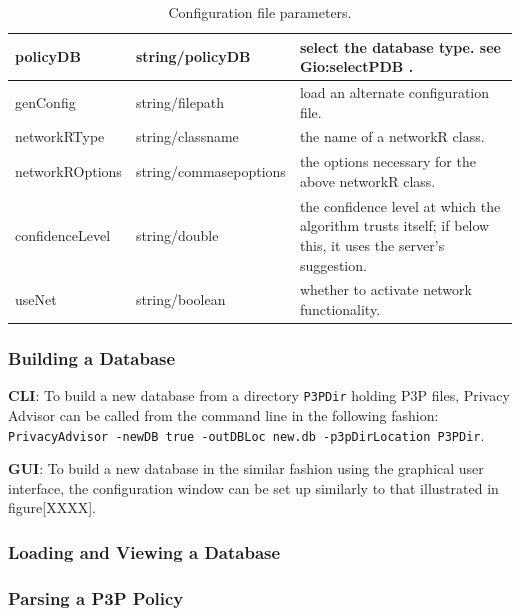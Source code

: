 \begin{center}
\begin{table}[h!]
\begin{tabular} { | l | l | p{7cm} | }
      policyDB & string/policyDB & select the database type. see Gio:selectPDB . \\ \hline
      genConfig	& string/filepath & load an alternate configuration file. \\ \hline
      networkRType & string/classname & the name of a networkR class. \\ \hline
      networkROptions & string/commasepoptions	& the options necessary for the above networkR class. \\ \hline
      confidenceLevel & string/double & the confidence level at which the algorithm trusts itself; if below this, it uses the server's suggestion. \\ \hline
      useNet & string/boolean & whether to activate network functionality. \\ \hline
      \hline
    \end{tabular}
    \caption{Configuration file parameters.}
  \end{table}
\end{center}

\subsubsection{Building a Database}

\textbf{CLI}: To build a new database from a directory \texttt{P3PDir} holding P3P files, Privacy
Advisor can be called from the command line in the following fashion:
\texttt{PrivacyAdvisor -newDB  true -outDBLoc new.db
  -p3pDirLocation P3PDir}.

\textbf{GUI}: To build a new database in the similar fashion using the
graphical user interface, the configuration window can be set up
similarly to that illustrated in figure[XXXX].



\subsubsection{Loading and Viewing a Database}



\subsubsection{Parsing a P3P Policy}
